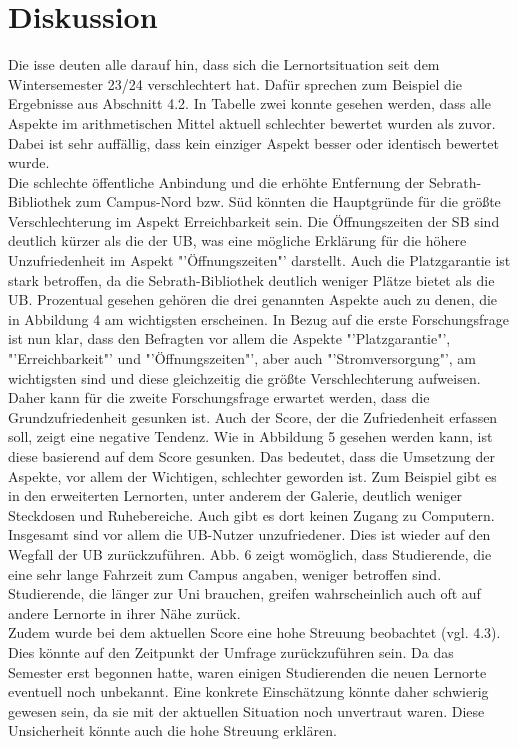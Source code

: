 \documentclass[11pt, a4paper]{article}
\begin{document}
\section{Diskussion}
Die isse deuten alle darauf hin, dass sich die Lernortsituation seit dem Wintersemester  23/24 verschlechtert hat. Dafür sprechen zum Beispiel die Ergebnisse aus Abschnitt 4.2. In Tabelle zwei konnte gesehen werden, dass alle Aspekte im arithmetischen Mittel aktuell schlechter bewertet wurden als zuvor. Dabei ist sehr auffällig, dass kein einziger Aspekt besser oder identisch bewertet wurde.\\
Die schlechte öffentliche Anbindung und die erhöhte Entfernung der Sebrath-Bibliothek zum Campus-Nord bzw. Süd könnten die Hauptgründe für die größte Verschlechterung im Aspekt Erreichbarkeit sein. Die Öffnungszeiten der SB sind deutlich kürzer als die der UB, was eine mögliche Erklärung für die höhere Unzufriedenheit im Aspekt "'Öffnungszeiten"' darstellt.
Auch die Platzgarantie ist stark betroffen, da die Sebrath-Bibliothek deutlich weniger Plätze bietet als die UB. 
Prozentual gesehen gehören die drei genannten Aspekte auch zu denen, die in Abbildung 4 am wichtigsten erscheinen. In Bezug auf die erste Forschungsfrage ist nun klar, dass den Befragten vor allem die Aspekte "'Platzgarantie"', "'Erreichbarkeit"' und "'Öffnungszeiten"', aber auch "'Stromversorgung"', am wichtigsten sind und diese gleichzeitig die größte Verschlechterung aufweisen. Daher kann für die zweite Forschungsfrage erwartet werden, dass die Grundzufriedenheit gesunken ist.
Auch der Score, der die Zufriedenheit erfassen soll, zeigt eine negative Tendenz. Wie in Abbildung 5 gesehen werden kann, ist diese basierend auf dem Score gesunken.
Das bedeutet, dass die Umsetzung der Aspekte, vor allem der Wichtigen, schlechter geworden ist.
Zum Beispiel gibt es in den erweiterten Lernorten, unter anderem der Galerie, deutlich weniger Steckdosen und Ruhebereiche. Auch gibt es dort keinen Zugang zu Computern.
Insgesamt sind vor allem die UB-Nutzer unzufriedener. Dies ist wieder auf den Wegfall der UB zurückzuführen.
Abb. 6 zeigt womöglich, dass Studierende, die eine sehr lange Fahrzeit zum Campus angaben, weniger betroffen sind. Studierende, die länger zur Uni brauchen, greifen wahrscheinlich auch oft auf andere Lernorte in ihrer Nähe zurück. \\
Zudem wurde bei dem aktuellen Score eine hohe Streuung beobachtet (vgl. 4.3). Dies könnte auf den Zeitpunkt der Umfrage zurückzuführen sein. Da das Semester erst begonnen hatte, waren einigen Studierenden die neuen Lernorte eventuell noch unbekannt. Eine konkrete Einschätzung könnte daher schwierig gewesen sein, da sie mit der aktuellen Situation noch unvertraut waren. Diese Unsicherheit könnte auch die hohe Streuung erklären.\\
\end{document}
